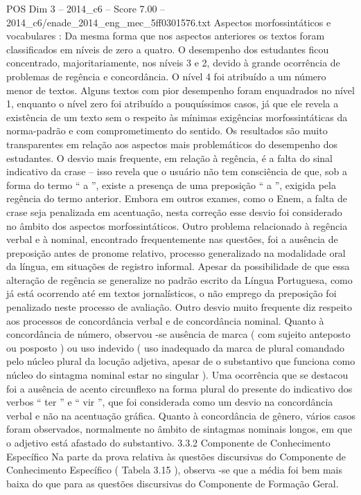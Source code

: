 \begin{textsample}{POS Dim 3 – 2014\_c6 – Score 7.00 – 2014\_c6/enade\_2014\_eng\_mec\_5ff0301576.txt}
Aspectos morfossintáticos e vocabulares : Da mesma forma que nos aspectos anteriores os textos foram classificados em níveis de zero a quatro.
O desempenho dos estudantes ficou concentrado, majoritariamente, nos níveis 3 e 2, devido à grande ocorrência de problemas de regência e concordância.
O nível 4 foi atribuído a um número menor de textos.
Alguns textos com pior desempenho foram enquadrados no nível 1, enquanto o nível zero foi atribuído a pouquíssimos casos, já que ele revela a existência de um texto sem o respeito às mínimas exigências morfossintáticas da norma-padrão e com comprometimento do sentido.
Os resultados são muito transparentes em relação aos aspectos mais problemáticos do desempenho dos estudantes.
O desvio mais frequente, em relação à regência, é a falta do sinal indicativo da crase – isso revela que o usuário não tem consciência de que, sob a forma do termo “ a ”, existe a presença de uma preposição “ a ”, exigida pela regência do termo anterior.
Embora em outros exames, como o Enem, a falta de crase seja penalizada em acentuação, nesta correção esse desvio foi considerado no âmbito dos aspectos morfossintáticos.
Outro problema relacionado à regência verbal e à nominal, encontrado frequentemente nas questões, foi a ausência de preposição antes de pronome relativo, processo generalizado na modalidade oral da língua, em situações de registro informal.
Apesar da possibilidade de que essa alteração de regência se generalize no padrão escrito da Língua Portuguesa, como já está ocorrendo até em textos jornalísticos, o não emprego da preposição foi penalizado neste processo de avaliação.
Outro desvio muito frequente diz respeito aos processos de concordância verbal e de concordância nominal.
Quanto à concordância de número, observou -se ausência de marca ( com sujeito anteposto ou posposto ) ou uso indevido ( uso inadequado da marca de plural comandado pelo núcleo plural da locução adjetiva, apesar de o substantivo que funciona como núcleo do sintagma nominal estar no singular ).
Uma ocorrência que se destacou foi a ausência de acento circunflexo na forma plural do presente do indicativo dos verbos “ ter ” e “ vir ”, que foi considerada como um desvio na concordância verbal e não na acentuação gráfica.
Quanto à concordância de gênero, vários casos foram observados, normalmente no âmbito de sintagmas nominais longos, em que o adjetivo está afastado do substantivo. 3.3.2 Componente de Conhecimento Específico Na parte da prova relativa às questões discursivas do Componente de Conhecimento Específico ( Tabela 3.15 ), observa -se que a média foi bem mais baixa do que para as questões discursivas do Componente de Formação Geral.

\end{textsample}
